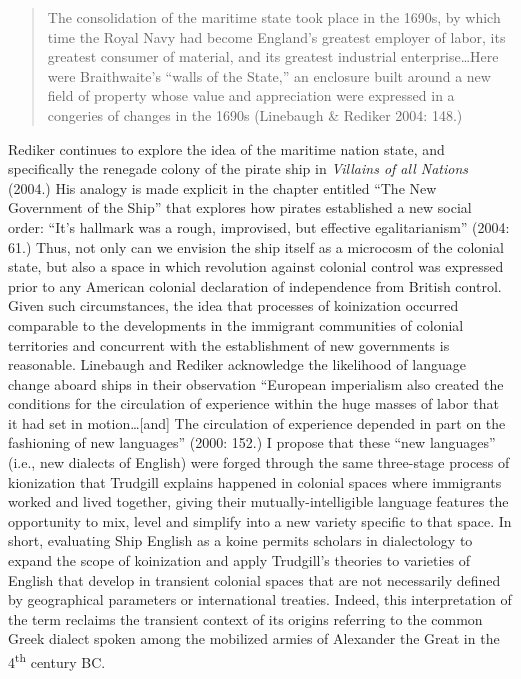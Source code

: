 \documentclass[12pt]{article}
\newenvironment{styleStandard}{\renewcommand\baselinestretch{1.0}\setlength\leftskip{0cm}\setlength\rightskip{0cm plus 1fil}\setlength\parindent{0cm}\setlength\parfillskip{0pt plus 1fil}\setlength\parskip{0in plus 1pt}\writerlistparindent\writerlistleftskip\leavevmode\normalfont\normalsize\writerlistlabel\ignorespaces}{\unskip\vspace{0in plus 1pt}\par}
\newcommand\writerlistleftskip{}
\newcommand\writerlistparindent{}
\newcommand\writerlistlabel{}
\begin{document}
\begin{quotation}
The consolidation of the maritime state took place in the 1690s, by which time the Royal Navy had become England’s greatest employer of labor, its greatest consumer of material, and its greatest industrial enterprise…Here were Braithwaite’s “walls of the State,” an enclosure built around a new field of property whose value and appreciation were expressed in a congeries of changes in the 1690s (Linebaugh \& Rediker 2004: 148.)

\end{quotation}
\begin{styleStandard}
Rediker continues to explore the idea of the maritime nation state, and specifically the renegade colony of the pirate ship in \textit{Villains of all Nations} (2004.) His analogy is made explicit in the chapter entitled “The New Government of the Ship” that explores how pirates established a new social order: “It’s hallmark was a rough, improvised, but effective egalitarianism” (2004: 61.) Thus, not only can we envision the ship itself as a microcosm of the colonial state, but also a space in which revolution against colonial control was expressed prior to any American colonial declaration of independence from British control. Given such circumstances, the idea that processes of koinization occurred comparable to the developments in the immigrant communities of colonial territories and concurrent with the establishment of new governments is reasonable. Linebaugh and Rediker acknowledge the likelihood of language change aboard ships in their observation “European imperialism also created the conditions for the circulation of experience within the huge masses of labor that it had set in motion…[and] The circulation of experience depended in part on the fashioning of new languages” (2000: 152.) I propose that these “new languages” (i.e., new dialects of English) were forged through the same three-stage process of kionization that Trudgill explains happened in colonial spaces where immigrants worked and lived together, giving their mutually-intelligible language features the opportunity to mix, level and simplify into a new variety specific to that space. In short, evaluating Ship English as a koine permits scholars in dialectology to expand the scope of koinization and apply Trudgill’s theories to varieties of English that develop in transient colonial spaces that are not necessarily defined by geographical parameters or international treaties. Indeed, this interpretation of the term reclaims the transient context of its origins referring to the common Greek dialect spoken among the mobilized armies of Alexander the Great in the 4\textsuperscript{th} century BC. 
\end{styleStandard}
\end{document}
